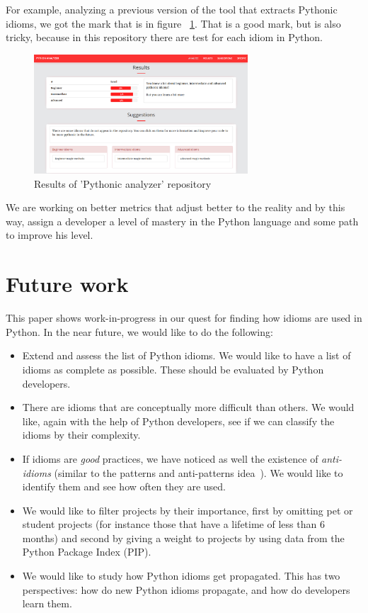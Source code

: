 \documentclass[a4paper]{article}
\begin{document}
For example, analyzing a previous version of the tool that extracts Pythonic idioms, we got the mark that is in figure ~\ref{fig:mark_pythonic}. That is a good mark, but is also tricky, because in this repository there are test for each idiom in Python.

\begin{figure}[ht]
\centering  
\includegraphics[width=80mm]{img/results_pythonic.png}
\caption{Results of 'Pythonic analyzer' repository}
\label{fig:mark_pythonic}
\end{figure}

We are working on better metrics that adjust better to the reality and by this way, assign a developer a level of mastery in the Python language and some path to improve his level.


\section{Future work}

This paper shows work-in-progress in our quest for finding how idioms are used in Python. In the near future, we would like to do the following:

\begin{itemize}

  \item Extend and assess the list of Python idioms. We would like to have a list of idioms as complete as possible. These should be evaluated by Python developers.
  
  \item There are idioms that are conceptually more difficult than others. We would like, again with the help of Python developers, see if we can classify the idioms by their complexity.
  
  \item If idioms are \emph{good} practices, we have noticed as well the existence of \emph{anti-idioms} (similar to the patterns and anti-patterns idea~\cite{brown1998antipatterns}). We would like to identify them and see how often they are used.
  
  \item We would like to filter projects by their importance, first by omitting pet or student projects (for instance those that have a lifetime of less than 6 months) and second by giving a weight to projects by using data from the Python Package Index (PIP).
  
  \item We would like to study how Python idioms get propagated. This has two perspectives: how do new Python idioms propagate, and how do developers learn them.

\end{itemize}
\end{document}
